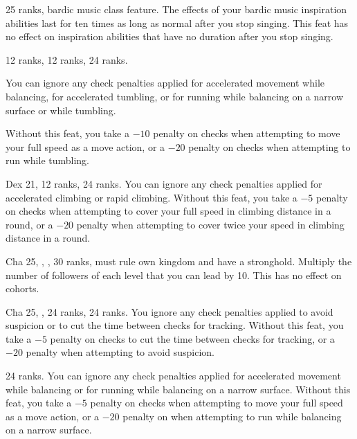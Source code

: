 { 25 ranks, bardic music class feature.}
{The effects of your bardic music inspiration abilities last for ten times as long as normal after you stop singing. This feat has no effect on inspiration abilities that have no duration after you stop singing.}

{}
{ 12 ranks,  12 ranks,  24 ranks.}
{
  You can ignore any check penalties applied for accelerated movement while balancing, for accelerated tumbling, or for running while balancing on a narrow surface or while tumbling.

}
{
  Without this feat, you take a $-10$ penalty on  checks when attempting to move your full speed as a move action, or a $-20$ penalty on  checks when attempting to run while tumbling.
}{}

{}
{Dex 21,  12 ranks,  24 ranks.}
{You can ignore any check penalties applied for accelerated climbing or rapid climbing.}
{Without this feat, you take a $-5$ penalty on  checks when attempting to cover your full speed in climbing distance in a round, or a $-20$ penalty when attempting to cover twice your speed in climbing distance in a round.}{}

{Cha 25, , ,  30 ranks, must rule own kingdom and have a stronghold.}
{Multiply the number of followers of each level that you can lead by 10. This has no effect on cohorts.}

{}
{Cha 25, ,  24 ranks,  24 ranks.}
{You ignore any check penalties applied to avoid suspicion or to cut the time between checks for tracking. }
{Without this feat, you take a $-5$ penalty on  checks to cut the time between checks for tracking, or a $-20$ penalty when attempting to avoid suspicion.}
{}

{}
{ 24 ranks.}
{
  You can ignore any check penalties applied for accelerated movement while balancing or for running while balancing on a narrow surface.
}
{
  Without this feat, you take a $-5$ penalty on  checks when attempting to move your full speed as a move action, or a $-20$ penalty on  when attempting to run while balancing on a narrow surface.
}{}

